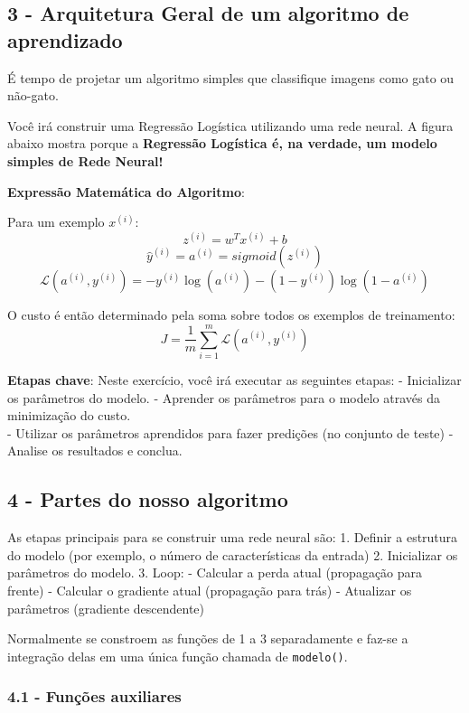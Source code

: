 \documentclass[11pt]{article}
\begin{document}
    \subsection{3 - Arquitetura Geral de um algoritmo de
aprendizado}\label{arquitetura-geral-de-um-algoritmo-de-aprendizado}

É tempo de projetar um algoritmo simples que classifique imagens como
gato ou não-gato.

Você irá construir uma Regressão Logística utilizando uma rede neural. A
figura abaixo mostra porque a \textbf{Regressão Logística é, na verdade,
um modelo simples de Rede Neural!}

\textbf{Expressão Matemática do Algoritmo}:

Para um exemplo \(x^{(i)}\): \[z^{(i)} = w^T x^{(i)} + b \tag{1}\]
\[\hat{y}^{(i)} = a^{(i)} = sigmoid(z^{(i)})\tag{2}\]
\[ \mathcal{L}(a^{(i)}, y^{(i)}) =  - y^{(i)}  \log(a^{(i)}) - (1-y^{(i)} )  \log(1-a^{(i)})\tag{3}\]

O custo é então determinado pela soma sobre todos os exemplos de
treinamento:
\[ J = \frac{1}{m} \sum_{i=1}^m \mathcal{L}(a^{(i)}, y^{(i)})\tag{4}\]

\textbf{Etapas chave}: Neste exercício, você irá executar as seguintes
etapas: - Inicializar os parâmetros do modelo. - Aprender os parâmetros
para o modelo através da minimização do custo.\\
- Utilizar os parâmetros aprendidos para fazer predições (no conjunto de
teste) - Analise os resultados e conclua.

    \subsection{4 - Partes do nosso
algoritmo}\label{partes-do-nosso-algoritmo}

As etapas principais para se construir uma rede neural são: 1. Definir a
estrutura do modelo (por exemplo, o número de características da
entrada) 2. Inicializar os parâmetros do modelo. 3. Loop: - Calcular a
perda atual (propagação para frente) - Calcular o gradiente atual
(propagação para trás) - Atualizar os parâmetros (gradiente descendente)

Normalmente se constroem as funções de 1 a 3 separadamente e faz-se a
integração delas em uma única função chamada de \texttt{modelo()}.

\subsubsection{4.1 - Funções auxiliares}\label{funuxe7uxf5es-auxiliares}
\end{document}
